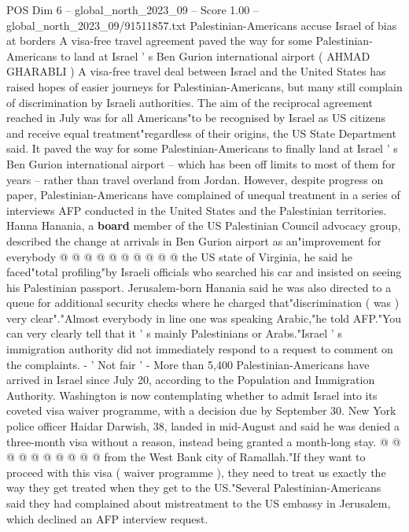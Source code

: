 \begin{textsample}{POS Dim 6 – global\_north\_2023\_09 – Score 1.00 – global\_north\_2023\_09/91511857.txt}  \label{ex:f6_pos_078}
Palestinian-Americans accuse Israel of bias at borders A visa-free travel agreement paved the way for some Palestinian-Americans to land at Israel ' s Ben Gurion international airport ( AHMAD GHARABLI ) A visa-free travel deal between Israel and the United States has raised hopes of easier journeys for Palestinian-Americans, but many still complain of discrimination by Israeli authorities.
The aim of the reciprocal agreement reached in July was for all Americans"to be recognised by Israel as US citizens and receive equal treatment"regardless of their origins, the US State Department said.
It paved the way for some Palestinian-Americans to finally land at Israel ' s Ben Gurion international airport -- which has been off limits to most of them for years -- rather than travel overland from Jordan.
However, despite progress on paper, Palestinian-Americans have complained of unequal treatment in a series of interviews AFP conducted in the United States and the Palestinian territories.
Hanna Hanania, a \textbf{board} member of the US Palestinian Council advocacy group, described the change at arrivals in Ben Gurion airport as an"improvement for everybody @ @ @ @ @ @ @ @ @ @ the US state of Virginia, he said he faced"total profiling"by Israeli officials who searched his car and insisted on seeing his Palestinian passport.
Jerusalem-born Hanania said he was also directed to a queue for additional security checks where he charged that"discrimination ( was ) very clear"."Almost everybody in line one was speaking Arabic,"he told AFP."You can very clearly tell that it ' s mainly Palestinians or Arabs."Israel ' s immigration authority did not immediately respond to a request to comment on the complaints. - ' Not fair ' - More than 5,400 Palestinian-Americans have arrived in Israel since July 20, according to the Population and Immigration Authority.
Washington is now contemplating whether to admit Israel into its coveted visa waiver programme, with a decision due by September 30.
New York police officer Haidar Darwish, 38, landed in mid-August and said he was denied a three-month visa without a reason, instead being granted a month-long stay. @ @ @ @ @ @ @ @ @ @ from the West Bank city of Ramallah."If they want to proceed with this visa ( waiver programme ), they need to treat us exactly the way they get treated when they get to the US."Several Palestinian-Americans said they had complained about mistreatment to the US embassy in Jerusalem, which declined an AFP interview request.

\end{textsample}
